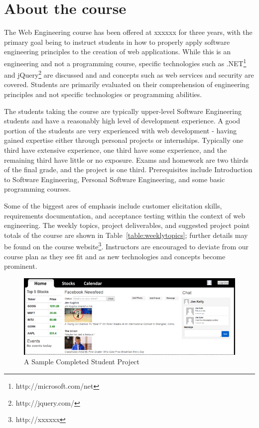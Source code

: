 \documentclass{sig-alternate}
\newif\ifisnopii
\begin{document}
\section{About the course}
\label{sec: aboutcourse}

%


The Web Engineering course has been offered at \ifisnopii RIT \else xxxxxx \fi for three years, with the primary goal being to instruct students in how to properly apply software engineering principles to the creation of web applications. While this is an engineering and not a programming course, specific technologies such as .NET\footnote{http://microsoft.com/net} and jQuery\footnote{http://jquery.com/} are discussed and and concepts such as web services and security are covered. Students are primarily evaluated on their comprehension of engineering principles and not specific technologies or programming abilities.

The students taking the course are typically upper-level Software Engineering students and have a reasonably high level of development experience. A good portion of the students are very experienced with web development - having gained expertise either through personal projects or internships. Typically one third have extensive experience, one third have some experience, and the remaining third have little or no exposure. Exams and homework are two thirds of the final grade, and the project is one third. Prerequisites include Introduction to Software Engineering, Personal Software Engineering, and some basic programming courses.

Some of the biggest ares of emphasis include customer elicitation skills, requirements documentation, and acceptance testing within the context of web engineering.  The weekly topics, project deliverables, and suggested project point totals of the course are shown in Table~\ref{table:weeklytopics}; further details may be found on the course website\footnote{\ifisnopii\url{http://www.se.rit.edu/~swen-344/}\else http://xxxxxx \fi}. Instructors are encouraged to deviate from our course plan as they see fit and as new technologies and concepts become prominent.


\begin{figure}[ht!]
\centering
\includegraphics[width=1.0\textwidth]{images/R2b.png}
\caption{A Sample Completed Student Project}
\label{fig:website1}
\end{figure}
\end{document}
